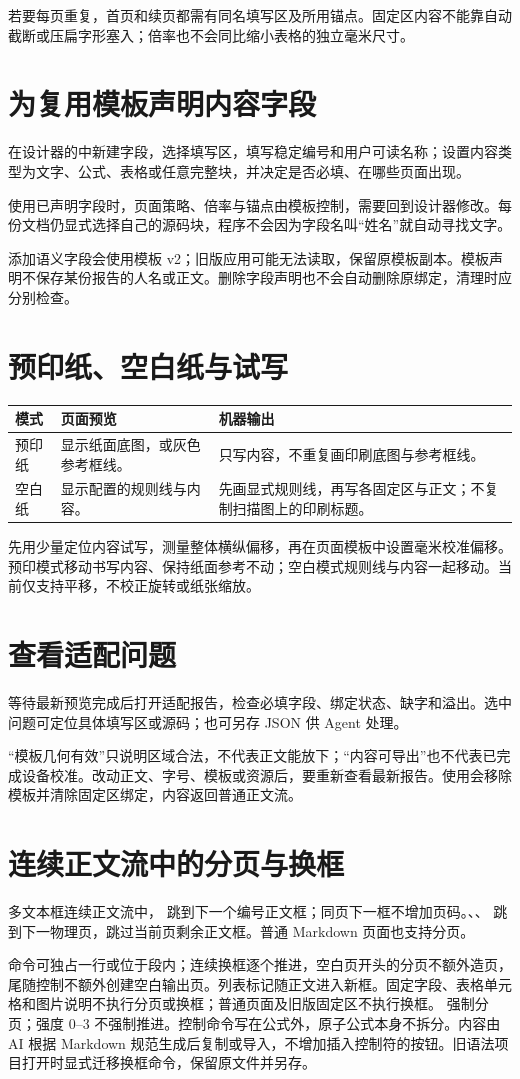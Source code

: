 若要每页重复，首页和续页都需有同名填写区及所用锚点。固定区内容不能靠自动截断或压扁字形塞入；倍率也不会同比缩小表格的独立毫米尺寸。

\section{为复用模板声明内容字段}
在设计器的中新建字段，选择填写区，填写稳定编号和用户可读名称；设置内容类型为文字、公式、表格或任意完整块，并决定是否必填、在哪些页面出现。

使用已声明字段时，页面策略、倍率与锚点由模板控制，需要回到设计器修改。每份文档仍显式选择自己的源码块，程序不会因为字段名叫“姓名”就自动寻找文字。

添加语义字段会使用模板 v2；旧版应用可能无法读取，保留原模板副本。模板声明不保存某份报告的人名或正文。删除字段声明也不会自动删除原绑定，清理时应分别检查。

\section{预印纸、空白纸与试写}
\par\noindent\begin{tabularx}{\linewidth}{@{}P{26mm}Y Y@{}}
\toprule
模式 & 页面预览 & 机器输出\\\midrule
预印纸 & 显示纸面底图，或灰色参考框线。 & 只写内容，不重复画印刷底图与参考框线。\\
空白纸 & 显示配置的规则线与内容。 & 先画显式规则线，再写各固定区与正文；不复制扫描图上的印刷标题。\\
\bottomrule
\end{tabularx}

先用少量定位内容试写，测量整体横纵偏移，再在页面模板中设置毫米校准偏移。预印模式移动书写内容、保持纸面参考不动；空白模式规则线与内容一起移动。当前仅支持平移，不校正旋转或纸张缩放。

\section{查看适配问题}
等待最新预览完成后打开适配报告，检查必填字段、绑定状态、缺字和溢出。选中问题可定位具体填写区或源码；也可另存 JSON 供 Agent 处理。

“模板几何有效”只说明区域合法，不代表正文能放下；“内容可导出”也不代表已完成设备校准。改动正文、字号、模板或资源后，要重新查看最新报告。使用会移除模板并清除固定区绑定，内容返回普通正文流。


\section{连续正文流中的分页与换框}
多文本框连续正文流中，\code{\framebreak} 跳到下一个编号正文框；同页下一框不增加页码。\code{\newpage}、\code{\pagebreak}、\code{\clearpage} 跳到下一物理页，跳过当前页剩余正文框。普通 Markdown 页面也支持分页。

命令可独占一行或位于段内；连续换框逐个推进，空白页开头的分页不额外造页，尾随控制不额外创建空白输出页。列表标记随正文进入新框。固定字段、表格单元格和图片说明不执行分页或换框；普通页面及旧版固定区不执行换框。\code{\pagebreak[4]} 强制分页；强度 0--3 不强制推进。控制命令写在公式外，原子公式本身不拆分。内容由 AI 根据 Markdown 规范生成后复制或导入，不增加插入控制符的按钮。旧语法项目打开时显式迁移换框命令，保留原文件并另存。
